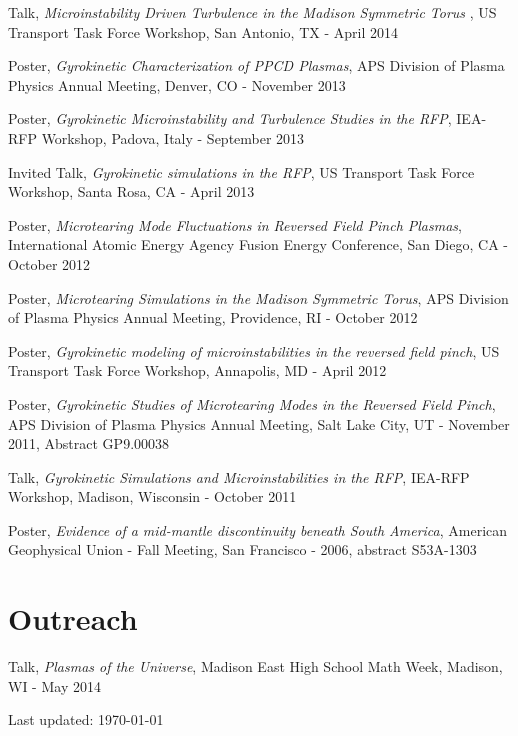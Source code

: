 \documentclass[letterpaper]{article}
\renewenvironment{itemize}{
  \begin{list}{}{
    \setlength{\leftmargin}{1.5em}
  }
}{
  \end{list}
}
\begin{document}
\begin{itemize}
\item Talk, {\it Microinstability Driven Turbulence in the Madison Symmetric Torus }, US Transport Task Force Workshop, San Antonio, TX - April 2014
\item Poster, {\it Gyrokinetic Characterization of PPCD Plasmas}, APS Division of Plasma Physics Annual Meeting, Denver, CO - November 2013
\item Poster, {\it Gyrokinetic Microinstability and Turbulence Studies in the RFP}, IEA-RFP Workshop, Padova, Italy - September 2013
\item Invited Talk, {\it Gyrokinetic simulations in the RFP}, US Transport Task Force Workshop, Santa Rosa, CA - April 2013
\item Poster, {\it Microtearing Mode Fluctuations in Reversed Field Pinch Plasmas}, International Atomic Energy Agency Fusion Energy Conference, San Diego, CA - October 2012
\item Poster, {\it Microtearing Simulations in the Madison Symmetric Torus}, APS Division of Plasma Physics Annual Meeting, Providence, RI - October 2012
\item Poster, {\it Gyrokinetic modeling of microinstabilities in the reversed field pinch}, US Transport Task Force Workshop, Annapolis, MD - April 2012
\item Poster, {\it Gyrokinetic Studies of Microtearing Modes in the Reversed Field Pinch}, APS Division of Plasma Physics Annual Meeting, Salt Lake City, UT - November 2011, Abstract GP9.00038
\item Talk, {\it Gyrokinetic Simulations and Microinstabilities in the RFP}, IEA-RFP Workshop, Madison, Wisconsin - October 2011
\item Poster, {\it Evidence of a mid-mantle discontinuity beneath South America}, American Geophysical Union - Fall Meeting, San Francisco - 2006, abstract S53A-1303
\end{itemize}

\section*{Outreach}

\begin{itemize}
\item Talk, {\it Plasmas of the Universe}, Madison East High School Math Week, Madison, WI - May 2014
\end{itemize}

\bigskip

\begin{center}
  \begin{footnotesize}
    Last updated: \today \\
  \end{footnotesize}
\end{center}
\end{document}
